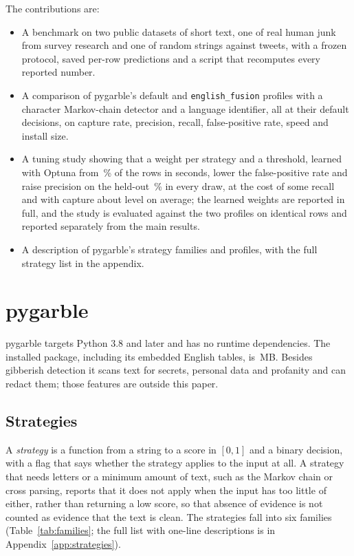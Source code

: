 \documentclass[10pt,twocolumn]{article}
\newcommand{\code}[1]{\texttt{#1}}
\begin{document}
The contributions are:
\begin{itemize}\setlength{\itemsep}{1pt}\raggedright
\item A benchmark on two public datasets of short text, one of real
  human junk from survey research and one of random strings against
  tweets, with a frozen protocol, saved per-row predictions and a script
  that recomputes every reported number.
\item A comparison of pygarble's default and \code{english\_fusion}
  profiles with a character Markov-chain detector and a language
  identifier, all at their default decisions, on capture rate, precision,
  recall, false-positive rate, speed and install size.
\item A tuning study showing that a weight per strategy and a threshold,
  learned with Optuna from \tuningpct\,\% of the rows in seconds, lower
  the false-positive rate and raise precision on the held-out
  \heldoutpct\,\% in every draw, at the cost of some recall and with
  capture about level on average; the learned weights are reported in
  full, and the study is evaluated against the two profiles on identical
  rows and reported separately from the main results.
\item A description of pygarble's strategy families and profiles, with
  the full strategy list in the appendix.
\end{itemize}

\section{pygarble}
\label{sec:pygarble}

pygarble targets Python 3.8 and later and has no runtime dependencies.
The installed package, including its embedded English tables, is
\,MB. Besides gibberish detection it scans text for
secrets, personal data and profanity and can redact them; those features
are outside this paper.

\subsection{Strategies}

A \emph{strategy} is a function from a string to a score in $[0,1]$ and a
binary decision, with a flag that says whether the strategy applies to
the input at all. A strategy that needs letters or a minimum amount of
text, such as the Markov chain or cross parsing, reports that it does not
apply when the input has too little of either, rather than returning a
low score, so that absence of evidence is not counted as evidence that
the text is clean. The \nstrategies{} strategies fall into six families
(Table~\ref{tab:families}; the full list with one-line descriptions is in
Appendix~\ref{app:strategies}).
\end{document}
